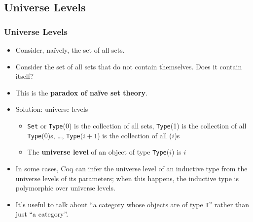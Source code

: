 \documentclass[utf8x]{beamer}
\begin{document}
  \subsection{Universe Levels}
    \begin{frame}
      \frametitle{Universe Levels }
      \begin{itemize}
        \item<1-7>
          Consider, na\"ively, the set of all sets.  
        \item<4-7>
          Consider the set of all sets that do not contain themselves.  Does it contain itself?
        \item<7->
          This is the \textbf{paradox of na\"ive set theory}.
        \item<8->
          Solution: universe levels
          \begin{itemize}
            \item<9->
              \texttt{Set} or \texttt{Type}(0) is the collection of all sets, \texttt{Type}(1) is the collection of all \texttt{Type}(0)s, \ldots, \texttt{Type}($i + 1$) is the collection of all ($i$)s
            \item<9->
              The \textbf{universe level} of an object of type \texttt{Type}($i$) is $i$
          \end{itemize}
        \item<10->
          In some cases, Coq can infer the universe level of an inductive type from the universe levels of its parameters; when this happens, the inductive type is polymorphic over universe levels.
        \item<11->
          It's useful to talk about ``a category whose objects are of type \texttt{T}'' rather than just ``a category''.
      \end{itemize}
    \end{frame}
  
\end{document}

